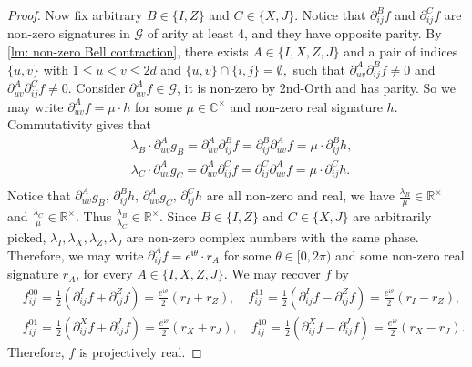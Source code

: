 \begin{proof}
    Now fix arbitrary $B\in \{I,Z\}$ and $C\in \{X,J\}.$
    Notice that $\partial_{ij}^Bf$ and $\partial_{ij}^Cf$ are non-zero signatures in $\mathcal{G}$ of arity at least 4, and they have opposite parity.
    By \cref{lm: non-zero Bell contraction}, there exists $A\in\{I,X,Z,J\}$ and a pair of indices $\{u,v\}$ with $1\le u<v\le 2d$ and $\{u,v\}\cap \{i,j\}=\emptyset,$ such that $\partial_{uv}^A\partial_{ij}^Bf\neq 0$ and $\partial_{uv}^A\partial_{ij}^Cf\neq 0.$
    Consider $\partial_{uv}^Af\in \mathcal{G}$, it is non-zero by {\sc 2nd-Orth} and has parity. 
    So we may write $\partial_{uv}^Af=\mu\cdot h$ for some $\mu\in \mathbb{C}^\times$ and non-zero real signature $h.$
    Commutativity gives that
    \begin{equation*}
        \begin{aligned}
            &\lambda_B\cdot \partial_{uv}^Ag_B=\partial_{uv}^A\partial_{ij}^Bf=\partial_{ij}^B\partial_{uv}^Af=\mu\cdot \partial_{ij}^Bh,\\
            &
            \lambda_C\cdot \partial_{uv}^Ag_C=\partial_{uv}^A\partial_{ij}^Cf=\partial_{ij}^C\partial_{uv}^Af=\mu\cdot \partial_{ij}^Ch.\\
        \end{aligned}
    \end{equation*}
    Notice that $\partial_{uv}^Ag_B,\,\partial_{ij}^Bh,\,\partial_{uv}^Ag_C,\,\partial_{ij}^Ch$ are all non-zero and real, we have $\frac{\lambda_B}{\mu}\in \mathbb{R}^\times$ and $\frac{\lambda_C}{\mu}\in \mathbb{R}^\times$.
    Thus $\frac{\lambda_B}{\lambda_C}\in \mathbb{R}^\times.$
    Since $B\in \{I,Z\}$ and $C\in\{X,J\}$ are arbitrarily picked, $\lambda_I,\lambda_X,\lambda_Z,\lambda_J$ are non-zero complex numbers with the same phase.
    Therefore, we may write $\partial_{ij}^Af=e^{\mathfrak i \theta} \cdot r_A$ for some $\theta\in [0,2\pi)$ and some non-zero real signature $r_A$, for every $A\in\{I,X,Z,J\}$.
    We may recover $f$ by 
    \begin{equation*}
        \begin{aligned}
            &f_{ij}^{00}=\frac{1}{2}(\partial_{ij}^If+\partial_{ij}^Zf)=\frac{e^{\mathfrak i \theta}}{2}(r_I+r_Z),\quad 
            f_{ij}^{11}=\frac{1}{2}(\partial_{ij}^If-\partial_{ij}^Zf)=\frac{e^{\mathfrak i \theta}}{2}(r_I-r_Z),\\
            &f_{ij}^{01}=\frac{1}{2}(\partial_{ij}^Xf+\partial_{ij}^Jf)=\frac{e^{\mathfrak i \theta}}{2}(r_X+r_J),\quad 
            f_{ij}^{10}=\frac{1}{2}(\partial_{ij}^Xf-\partial_{ij}^Jf)=\frac{e^{\mathfrak i \theta}}{2}(r_X-r_J).
        \end{aligned}
    \end{equation*}
    Therefore, $f$ is projectively real.
\end{proof}

